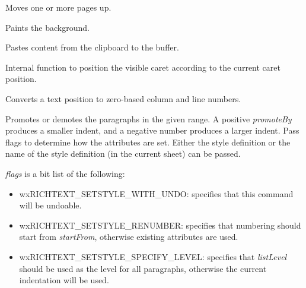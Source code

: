 Moves one or more pages up.

\label{wxrichtextctrlpaintbackground}


Paints the background.

\label{wxrichtextctrlpaste}


Pastes content from the clipboard to the buffer.

\label{wxrichtextctrlpositioncaret}


Internal function to position the visible caret according to the current caret position.

\label{wxrichtextctrlpositiontoxy}


Converts a text position to zero-based column and line numbers.

\label{wxrichtextctrlpromotelist}



Promotes or demotes the paragraphs in the given range. A positive {\it promoteBy} produces a smaller indent, and a negative number
produces a larger indent. Pass flags to determine how the attributes are set.
Either the style definition or the name of the style definition (in the current sheet) can be passed.

{\it flags} is a bit list of the following:

\begin{itemize}\itemsep=0pt
\item wxRICHTEXT\_SETSTYLE\_WITH\_UNDO: specifies that this command will be undoable.
\item wxRICHTEXT\_SETSTYLE\_RENUMBER: specifies that numbering should start from {\it startFrom}, otherwise existing attributes are used.
\item wxRICHTEXT\_SETSTYLE\_SPECIFY\_LEVEL: specifies that {\it listLevel} should be used as the level for all paragraphs, otherwise the current indentation will be used.
\end{itemize}

